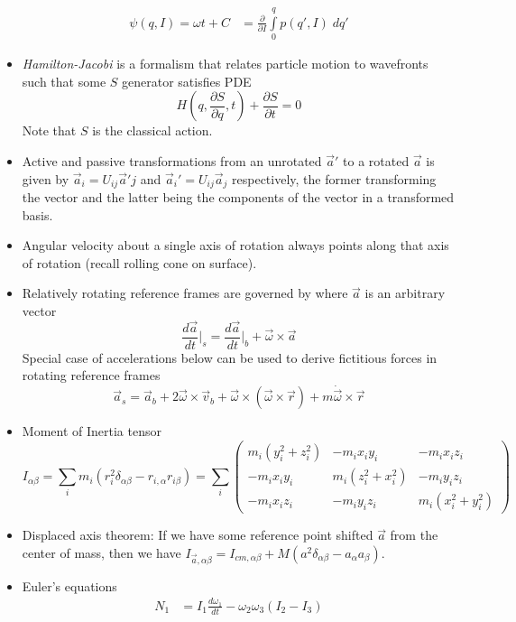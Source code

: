 \documentclass[10pt]{report}
\newcommand{\rd}[2]{\frac{d#1}{d#2}}
\newcommand{\pd}[2]{\frac{\partial #1}{\partial#2}}
\begin{document}
\begin{itemize}
\begin{align*}
            \psi(q,I) = \omega t + C &= \pd{}{I}\displaystyle\int\limits_{0}^{q}p(q',I)\;dq'
        \end{align*}
    \item \emph{Hamilton-Jacobi} is a formalism that relates particle motion to wavefronts such that some $S$ generator satisfies PDE
        $$H\left( q, \pd{S}{q},t \right) + \pd{S}{t} = 0$$
        Note that $S$ is the classical action.
    \item Active and passive transformations from an unrotated $\vec{a}'$ to a rotated $\vec{a}$ is given by $\vec{a}_i = U_{ij}\vec{a}'j$ and $\vec{a}_i' = U_{ij} \vec{a}_j$ respectively, the former transforming the vector and the latter being the components of the vector in a transformed basis.
    \item Angular velocity about a single axis of rotation always points along that axis of rotation (recall rolling cone on surface).
    \item Relatively rotating reference frames are governed by where $\vec{a}$ is an arbitrary vector
        $$\rd{\vec{a}}{t}\Big|_s = \rd{\vec{a}}{t}\Big|_b + \vec{\omega}\times \vec{a}$$
        Special case of accelerations below can be used to derive fictitious forces in rotating reference frames
        $$\vec{a}_s =\vec{a}_b + 2\vec{\omega} \times \vec{v}_b + \vec{\omega}\times\left( \vec{\omega}\times \vec{r} \right) + m\dot{\vec{\omega}}\times \vec{r}$$
    \item Moment of Inertia tensor 
        $$I_{\alpha\beta} = \sum_i m_i \left( r_i^2\delta_{\alpha\beta} - r_{i,\alpha}r_{i\beta} \right) = \sum_i\begin{pmatrix}
             m_i\left( y_i^2 + z_i^2 \right)& - m_i x_i y_i & -m_i x_i z_i\\
            -m_i x_i y_i & m_i \left( z_i^2 + x_i^2 \right) & -m_i y_i z_i\\
            -m_i x_i z_i & -m_i y_i z_i & m_i\left( x_i^2 + y_i^2 \right)
        \end{pmatrix}$$
    \item Displaced axis theorem: If we have some reference point shifted $\vec{a}$ from the center of mass, then we have $I_{\vec{a},\alpha\beta} = I_{cm,\alpha\beta} + M\left( a^2 \delta_{\alpha\beta} - a_\alpha a_\beta \right)$. 
    \item Euler's equations
        \begin{align*}
            N_1 &= I_1 \rd{\omega_1}{t} - \omega_2 \omega_3 \left( I_2 - I_3 \right)\\

\end{align*}
\end{itemize}
\end{document}
